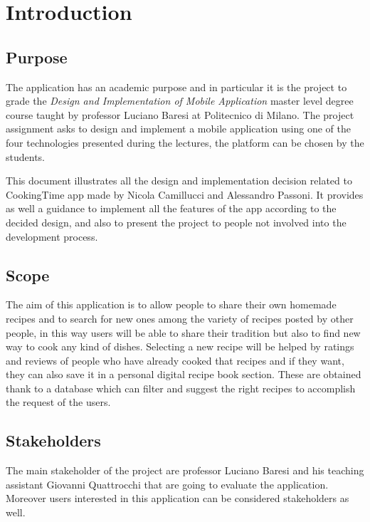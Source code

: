 \chapter{Introduction}

	\section{Purpose}
		The application has an academic purpose and in particular it is the project to grade the \textit{Design and Implementation of Mobile Application} master level degree course taught by professor Luciano Baresi at Politecnico di Milano.
		The project assignment asks to design and implement a mobile application using one of the four technologies presented during the lectures, the platform can be chosen by the students. 

		This document illustrates all the design and implementation decision related to CookingTime app made by Nicola Camillucci and Alessandro Passoni. 
		It provides as well a guidance to implement all the features of the app according to the decided design, and also to present the project to people not involved into the development process.


	\section{Scope}
		The aim of this application is to allow people to share their own homemade recipes and to search for new ones among the variety of recipes posted by other people, in this way users will be able to share their tradition but also to find new way to cook any kind of dishes.
		Selecting a new recipe will be helped by ratings and reviews of people who have already cooked that recipes and if they want, they can also save it in a personal digital recipe book section.
		These are obtained thank to a database which can filter and suggest the right recipes to accomplish the request of the users.


	\section{Stakeholders}
		The main stakeholder of the project are professor Luciano Baresi and his teaching assistant Giovanni Quattrocchi that are going to evaluate the application.
		Moreover users interested in this application can be considered stakeholders as well.


